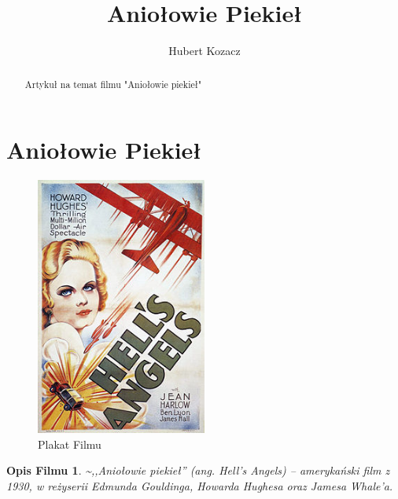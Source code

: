 ﻿\documentclass[a4paper]{article}
\author{Hubert Kozacz}
\title{Aniołowie Piekieł}
\newtheorem{theorem}{Opis Filmu}
\begin{document}
\begin{abstract}
Artykuł na temat filmu "Aniołowie piekieł"
\end{abstract}
\tableofcontents
\section{Aniołowie Piekieł}
\begin{figure}[h!]
  \caption{Plakat Filmu}
  \centering
    \includegraphics[width=0.5\textwidth]{pics/Poster.jpg}
\end{figure}

\begin{theorem}
\label{film}
\~{},,Aniołowie piekieł'' (ang. Hell’s Angels) – amerykański film z 1930, w reżyserii Edmunda Gouldinga, Howarda Hughesa oraz Jamesa Whale’a.
\end{theorem}
\end{document}
